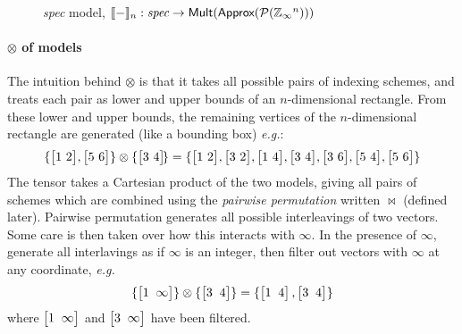 \documentclass[10pt,preprint]{sigplanconf}
\theoremstyle{definition}
\newcommand{\eg}{\emph{e.g.}}
\newcommand{\interp}[1]{\llbracket{#1}\rrbracket}
\newcommand{\vtwohs}[2]{\setlength{\arraycolsep}{0em}
\left[\begin{array}{cc}#1 \, & \, #2\end{array}\right]\!}
\newcommand{\vtwoh}[2]{\setlength{\arraycolsep}{0em}
\left[\begin{array}{cc}#1 \; & \; #2\end{array}\right]}
\begin{document}

%


%

\begin{figure}

\caption{\textit{spec} model,
$\interp{-}_n : \textit{spec} \rightarrow \textsf{Mult}(\textsf{Approx}(\mathcal{P}(\domainVal{}^n)))$}
\label{fig:spatial-model}
\vspace{-0.75em}
\end{figure}

\paragraph{$\otimes$ of models}

The intuition behind $\otimes$ is that it takes all possible pairs of
indexing schemes, and treats each pair as lower and upper bounds of an
$n$-dimensional rectangle. From these lower and upper bounds,
the remaining vertices of the $n$-dimensional rectangle are
generated (like a bounding box) \eg{}:
\begin{align*}
\{\vtwohs{1}{2}, \vtwohs{5}{6}\,\} \otimes \{\vtwohs{3}{4}\} =
\{\vtwohs{1}{2}, \vtwohs{3}{2}, \vtwohs{1}{4}, \vtwohs{3}{4},
   \vtwohs{3}{6}, \vtwohs{5}{4}, \vtwohs{5}{6}\,\}
\end{align*}
The tensor takes a Cartesian product of the two models,
giving all pairs of schemes which are combined using the
\emph{pairwise permutation} written $\bowtie$ (defined later).
Pairwise permutation generates all possible interleavings of two
vectors. Some care is then taken over how this interacts with $\infty$.
In the presence of $\infty$, generate all interlavings as if $\infty$ is
an integer, then filter out vectors with $\infty$ at any coordinate, \eg{}
\begin{align*}
\{\vtwoh{1}{\infty}\} \otimes \{\vtwoh{3}{4}\} =
\{\vtwoh{1}{4}, \vtwoh{3}{4}\}
\end{align*}
%
where $\vtwoh{1}{\infty}$ and $\vtwoh{3}{\infty}$ have been filtered.
\end{document}

